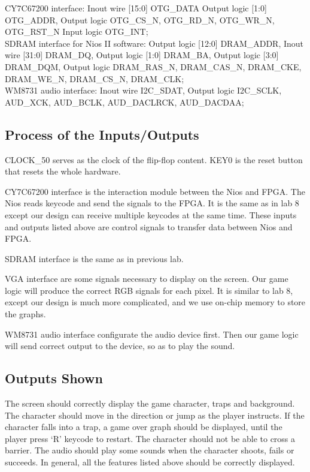 \documentclass[12pt]{article}
\begin{document}
CY7C67200 interface:
Inout wire [15:0] OTG\_DATA
Output logic [1:0] OTG\_ADDR,
Output logic OTG\_CS\_N, OTG\_RD\_N, OTG\_WR\_N, OTG\_RST\_N
Input logic OTG\_INT; \\

SDRAM interface for Nios II software:
Output logic [12:0] DRAM\_ADDR,
Inout wire [31:0] DRAM\_DQ, 
Output logic [1:0] DRAM\_BA,
Output logic [3:0] DRAM\_DQM,
Output logic DRAM\_RAS\_N, DRAM\_CAS\_N, DRAM\_CKE, DRAM\_WE\_N, DRAM\_CS\_N, DRAM\_CLK; \\

WM8731 audio interface:
Inout wire I2C\_SDAT,
Output logic I2C\_SCLK, AUD\_XCK, AUD\_BCLK, AUD\_DACLRCK, AUD\_DACDAA; \\

\subsection{Process of the Inputs/Outputs}
CLOCK\_50 serves as the clock of the flip-flop content. KEY0 is the reset button that resets the whole hardware.

CY7C67200 interface is the interaction module between the Nios and FPGA. The Nios reads keycode and send the signals to the FPGA. It is the same as in lab 8 except our design can receive multiple keycodes at the same time. These inputs and outputs listed above are control signals to transfer data between Nios and FPGA.

SDRAM interface is the same as in previous lab.

VGA interface are some signals necessary to display on the screen. Our game logic will produce the correct RGB signals for each pixel. It is similar to lab 8, except our design is much more complicated, and we use on-chip memory to store the graphs.

WM8731 audio interface configurate the audio device first. Then our game logic will send correct output to the device, so as to play the sound. 

\subsection{Outputs Shown}
The screen should correctly display the game character, traps and background. The character should move in the direction or jump as the player instructs. If the character falls into a trap, a game over graph should be displayed, until the player press ‘R’ keycode to restart. The character should not be able to cross a barrier. The audio should play some sounds when the character shoots, fails or succeeds. In general, all the features listed above should be correctly displayed. 
\end{document}
